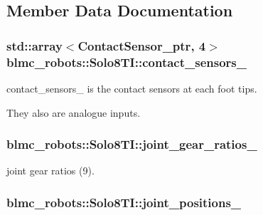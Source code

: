 \subsection{Member Data Documentation}
\subsubsection[{\texorpdfstring{contact\+\_\+sensors\+\_\+}{contact_sensors_}}]{\setlength{\rightskip}{0pt plus 5cm}std\+::array$<${\bf Contact\+Sensor\+\_\+ptr}, 4$>$ blmc\+\_\+robots\+::\+Solo8\+T\+I\+::contact\+\_\+sensors\+\_\+\hspace{0.3cm}{\ttfamily [private]}}\hypertarget{classblmc__robots_1_1Solo8TI_afc6e87d1cec24fd373345e41df874baf}{}\label{classblmc__robots_1_1Solo8TI_afc6e87d1cec24fd373345e41df874baf}


contact\+\_\+sensors\+\_\+ is the contact sensors at each foot tips. 

They also are analogue inputs. 
\subsubsection[{\texorpdfstring{joint\+\_\+gear\+\_\+ratios\+\_\+}{joint_gear_ratios_}}]{ blmc\+\_\+robots\+::\+Solo8\+T\+I\+::joint\+\_\+gear\+\_\+ratios\+\_\+\hspace{0.3cm}{\ttfamily [private]}}\hypertarget{classblmc__robots_1_1Solo8TI_a670ec9c986127612259d66e4f33d20b3}{}\label{classblmc__robots_1_1Solo8TI_a670ec9c986127612259d66e4f33d20b3}


joint gear ratios (9). 

\subsubsection[{\texorpdfstring{joint\+\_\+positions\+\_\+}{joint_positions_}}]{ blmc\+\_\+robots\+::\+Solo8\+T\+I\+::joint\+\_\+positions\+\_\+\hspace{0.3cm}{\ttfamily [private]}}\hypertarget{classblmc__robots_1_1Solo8TI_a6ca7d08522f038dc47d6a97f937c6f75}{}\label{classblmc__robots_1_1Solo8TI_a6ca7d08522f038dc47d6a97f937c6f75}


